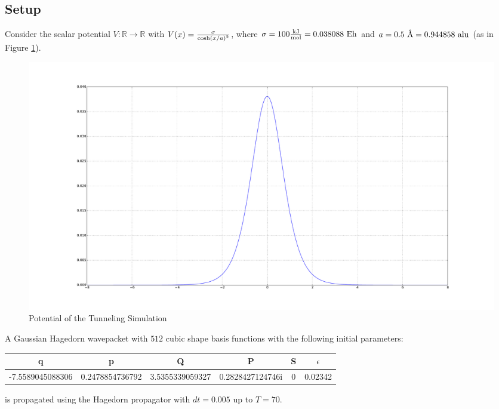 \subsection{Setup}
Consider the scalar potential $V: \mathbb{R} \rightarrow \mathbb{R}$ with $V(x) = { \sigma \over \cosh(x/a)^2 }$, where $\sigma = 100 {\text{kJ} \over \text{mol}} = 0.038088 \text{ Eh}$ and $a = 0.5\text{ \r{A}} = 0.944858 \text{ alu}$ (as in Figure \ref{fig:tunneling_pot}). 
\begin{figure}
\includegraphics[width=\textwidth]{Figures/tunneling_pot.pdf}
\caption{Potential of the Tunneling Simulation}
\label{fig:tunneling_pot}
\end{figure}
\FloatBarrier

A Gaussian Hagedorn wavepacket\cite{H_ladder_operators} with $512$ cubic shape basis functions with the following initial parameters:
\begin{center}
 \begin{tabular}{|c c c c c c|} 
 \hline
 q & p & Q & P & S & $\epsilon$\\ [0.5ex] 
 \hline
 -7.5589045088306 & 0.2478854736792 & 3.5355339059327 & 0.2828427124746i & 0 & 0.02342\\ 
 \hline
\end{tabular}
\end{center}
is propagated using the Hagedorn propagator with $dt = 0.005$ up to $T = 70$.

